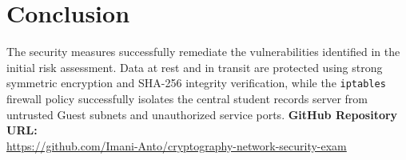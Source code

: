 \documentclass[11pt,a4paper]{article}
\begin{document}
\section{Conclusion}
The security measures successfully remediate the vulnerabilities identified in the initial risk assessment. Data at rest and in transit are protected using strong symmetric encryption and SHA-256 integrity verification, while the \texttt{iptables} firewall policy successfully isolates the central student records server from untrusted Guest subnets and unauthorized service ports.
\vspace{0.5cm}
\noindent\textbf{GitHub Repository URL:} \\
\url{https://github.com/Imani-Anto/cryptography-network-security-exam}
\end{document}
